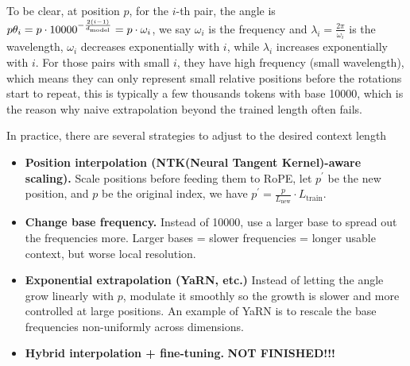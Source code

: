 \documentclass[11pt]{article}  %
\begin{document}
To be clear, at position $p$, for the $i$-th pair, the angle is $p\theta_i = p \cdot 10000^{-\frac{2(i - 1)}{d_{\text{model}}}} = p \cdot \omega_i$, we say $\omega_i$ is the frequency and $\lambda_i = \frac{2\pi}{\omega_i}$ is the wavelength, $\omega_i$ decreases exponentially with $i$, while $\lambda_i$ increases exponentially with $i$.
For those pairs with small $i$, they have high frequency (small wavelength), which means they can only represent small relative positions before the rotations start to repeat, this is typically a few thousands tokens with base 10000, which is the reason why naive extrapolation beyond the trained length often fails.

In practice, there are several strategies to adjust to the desired context length
\begin{itemize}
  \item \textbf{Position interpolation (NTK(Neural Tangent Kernel)-aware scaling).} Scale positions before feeding them to RoPE, let $p^\prime$ be the new position, and $p$ be the original index, we have $p^\prime = \frac{p}{L_{\text{new}}} \cdot L_{\text{train}}$.
  
  \item \textbf{Change base frequency.} Instead of 10000, use a larger base to spread out the frequencies more. Larger bases = slower frequencies = longer usable context, but worse local resolution.
  
  \item \textbf{Exponential extrapolation (YaRN, etc.)} Instead of letting the angle grow linearly with $p$, modulate it smoothly so the growth is slower and more controlled at large positions. An example of YaRN is to rescale the base frequencies non-uniformly across dimensions.
  
  \item \textbf{Hybrid interpolation + fine-tuning.} \textbf{NOT FINISHED!!!}
\end{itemize}
\end{document}
